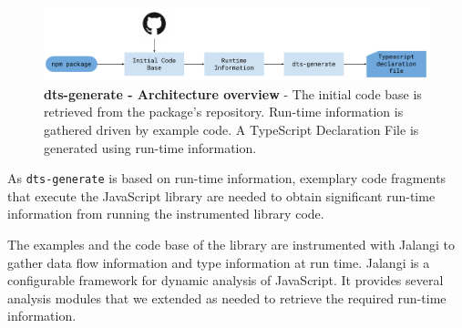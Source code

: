 \documentclass[english,cleveref,autoref,submission]{programming}
\newcommand{\figref}[1]{Figure~\ref{#1}}
\begin{document}

\begin{figure}[tp]
    \centering
    \includegraphics[width=1\linewidth]{dts-generate-block-diagram.pdf}
    \caption[dts-generate - Architecture overview]{\textbf{dts-generate - Architecture
        overview} - The initial code base is retrieved from the \NPM{} package's
      repository.
      Run-time information is gathered driven by example code.
      A TypeScript Declaration File is generated using run-time
      information.
    } 
    \label{fig:tsd_generation_method_block_diagram}
  \end{figure}

As \texttt{dts-generate} is based on run-time information, 
exemplary code fragments that execute the JavaScript library are
needed to obtain 
significant run-time information from running the instrumented library
code.


The examples and the code base of the library are instrumented with
Jalangi \cite{DBLP:conf/sigsoft/SenKBG13} to gather data flow
information and type information at run time. Jalangi is a configurable
framework for dynamic analysis of JavaScript. It provides several
analysis modules that we extended as needed to retrieve the required
run-time information.
\end{document}
